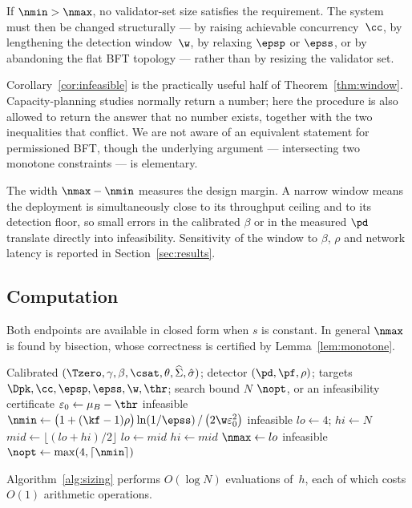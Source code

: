 \begin{Corollary}
\label{cor:infeasible}
If $\nmin>\nmax$, no validator-set size satisfies the requirement. The system
must then be changed structurally --- by raising achievable concurrency~$\cc$,
by lengthening the detection window~$\w$, by relaxing $\epsp$ or $\epss$, or by
abandoning the flat BFT topology --- rather than by resizing the validator set.
\end{Corollary}

Corollary~\ref{cor:infeasible} is the practically useful half of
Theorem~\ref{thm:window}. Capacity-planning studies normally return a number;
here the procedure is also allowed to return the answer that no number exists,
together with the two inequalities that conflict. We are not aware of an
equivalent statement for permissioned BFT, though the underlying argument ---
intersecting two monotone constraints --- is elementary.

\begin{Remark}
The width $\nmax-\nmin$ measures the design margin. A narrow window means the
deployment is simultaneously close to its throughput ceiling and to its
detection floor, so small errors in the calibrated $\beta$ or in the measured
$\pd$ translate directly into infeasibility. Sensitivity of the window to
$\beta$, $\rho$ and network latency is reported in Section~\ref{sec:results}.
\end{Remark}

\subsection{Computation}

Both endpoints are available in closed form when $s$ is constant. In general
$\nmax$ is found by bisection, whose correctness is certified by
Lemma~\ref{lem:monotone}.

\begin{Algorithm}[!t]
\caption{Validator-set sizing}
\label{alg:sizing}
\REQUIRE Calibrated $(\Tzero,\gamma,\beta,\csat,\theta,\widehat{\Sigma},
         \hat\sigma)$; detector $(\pd,\pf,\rho)$; targets
         $\Dpk,\cc,\epsp,\epss,\w,\thr$; search bound $N$
\ENSURE $\nopt$, or an infeasibility certificate
\STATE $\varepsilon_{0}\leftarrow\mu_{B}-\thr$ 
  \STATE \RET infeasible 
\ENDIF
\STATE $\nmin\leftarrow\bigl(1+(\kf-1)\rho\bigr)\ln(1/\epss)\,/\,
        \bigl(2\w\varepsilon_{0}^{2}\bigr)$
  \STATE \RET infeasible 
\ENDIF
\STATE $lo\leftarrow4$; $hi\leftarrow N$
  \STATE $mid\leftarrow\lfloor(lo+hi)/2\rfloor$
    \STATE $lo\leftarrow mid$
  \ELSE
    \STATE $hi\leftarrow mid$
  \ENDIF
\ENDWHILE
\STATE $\nmax\leftarrow lo$
  \STATE \RET infeasible 
\ENDIF
\STATE \RET $\nopt\leftarrow\max(4,\lceil\nmin\rceil)$
\end{Algorithm}

Algorithm~\ref{alg:sizing} performs $O(\log N)$ evaluations of~$h$, each of
which costs $O(1)$ arithmetic operations.
